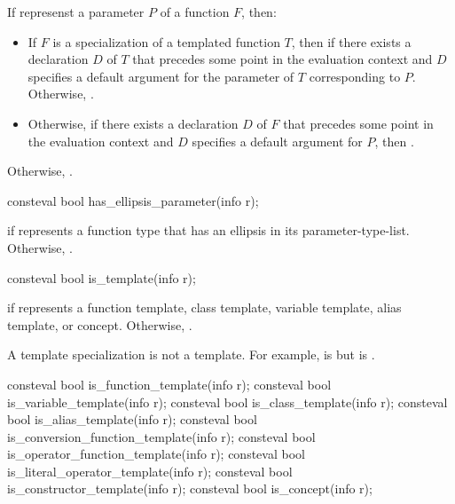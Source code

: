 \begin{itemdescr}
\pnum
\returns
If  represenst a parameter $P$ of a function $F$, then:
\begin{itemize}
\item
  If $F$ is a specialization of a templated function $T$,
  then  if there exists a declaration $D$ of $T$
  that precedes some point in the evaluation context
  and $D$ specifies a default argument
  for the parameter of $T$ corresponding to $P$.
  Otherwise, .
\item
  Otherwise, if there exists a declaration $D$ of $F$
  that precedes some point in the evaluation context
  and $D$ specifies a default argument for $P$,
  then .
\end{itemize}
Otherwise, .
\end{itemdescr}

%
\begin{itemdecl}
consteval bool has_ellipsis_parameter(info r);
\end{itemdecl}

\begin{itemdescr}
\pnum
\returns
{} if  represents a function type
that has an ellipsis in its parameter-type-list.
Otherwise, .
\end{itemdescr}

%
\begin{itemdecl}
consteval bool is_template(info r);
\end{itemdecl}

\begin{itemdescr}
\pnum
\returns
{} if  represents a
function template,
class template,
variable template,
alias template, or
concept.
Otherwise, .

\pnum
\begin{note}
A template specialization is not a template.
For example,
 is 
but  is .
\end{note}
\end{itemdescr}

%
%
%
%
%
%
%
%
%
\begin{itemdecl}
consteval bool is_function_template(info r);
consteval bool is_variable_template(info r);
consteval bool is_class_template(info r);
consteval bool is_alias_template(info r);
consteval bool is_conversion_function_template(info r);
consteval bool is_operator_function_template(info r);
consteval bool is_literal_operator_template(info r);
consteval bool is_constructor_template(info r);
consteval bool is_concept(info r);
\end{itemdecl}

